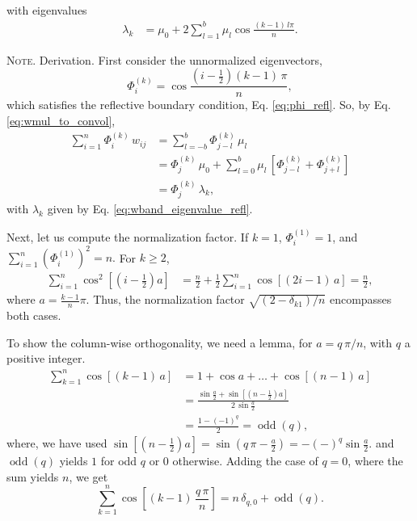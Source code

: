 \documentclass[preprint, floatfix]{revtex4-1}
\newcommand{\note}[1]{{\color{DarkGreen}\footnotesize \textsc{Note.} #1}}
\begin{document}
%
with eigenvalues
%
\begin{align}
  \lambda_k
  &=
  \mu_0
  +
  2
  \sum_{l = 1}^b
    \mu_l
    \cos \frac{(k - 1)  \, l \pi}{n}
  .
\label{eq:wband_eigenvalue_refl}
\end{align}
%
\note{Derivation.
  First consider the unnormalized eigenvectors,
  $$
  \Phi^{(k)}_i
  =
  \cos \frac{ \left( i - \frac 1 2 \right) (k - 1) \, \pi}{n},
  $$
  which satisfies the reflective boundary condition,
  Eq. \eqref{eq:phi_refl}.
  So, by Eq. \eqref{eq:wmul_to_convol},
  $$
  \begin{aligned}
  \sum_{i = 1}^n
    \Phi^{(k)}_i \, w_{ij}
  &=
  \sum_{l = -b}^b
    \Phi^{(k)}_{j - l} \, \mu_l
  \\
  &=
    \Phi^{(k)}_j \, \mu_0
  + \sum_{l=0}^{b}
    \mu_l \,
    \left[
      \Phi^{(k)}_{j-l}
      +
      \Phi^{(k)}_{j+l}
    \right]
  \\
  &= \Phi^{(k)}_j \, \lambda_k,
  \end{aligned}
  $$
  with $\lambda_k$ given by Eq. \eqref{eq:wband_eigenvalue_refl}.

  \hrulefill

  Next, let us compute the normalization factor.
  If $k = 1$, $\Phi^{(1)}_i = 1$, and
  $
  \sum_{i = 1}^n \left( \Phi^{(1)}_i \right)^2 = n.
  $
  For $k \ge 2$,
  $$
  \begin{aligned}
    \sum_{i = 1}^n \cos^2 \left[\left(i - \frac1 2 \right) a\right]
    &=
    \frac n 2
    +
    \frac 1 2
    \sum_{i = 1}^n \cos\left[(2 i - 1)\, a \right]
    =
    \frac n 2,
  \end{aligned}
  $$
  where $a = \frac{k-1}{n} \pi$.
  Thus, the normalization factor $\sqrt{(2 - \delta_{k1})/n}$
  encompasses both cases.

  \hrulefill

  To show the column-wise orthogonality,
  we need a lemma, for $a = q \, \pi/n$,
  with $q$ a positive integer.
  $$
  \begin{aligned}
  \sum_{k = 1}^n \cos[(k - 1) \, a]
  &=
  1 + \cos a + \dots + \cos[(n - 1) \, a]
  \\
  &=
  \frac{
        \sin\frac a 2
      + \sin \left[ \left( n - \frac 1 2 \right) a \right]
      }
      {
        2 \, \sin \frac a 2
      }
  \\
  &=
  \frac{ 1 - (-1)^q } { 2 }
  = \operatorname{odd}(q),
  \end{aligned}
  $$
  where, we have used
  $\sin \left[ \left( n - \frac 1 2 \right) a \right]
  = \sin \left( q \, \pi - \frac a 2 \right)
  = -(-)^q\sin\frac a 2.$
  and $\operatorname{odd}(q)$
  yields $1$ for odd $q$ or $0$ otherwise.
  Adding the case of $q = 0$, where the sum yields $n$,
  we get
  $$
  \sum_{k = 1}^n
    \cos\left[(k - 1) \, \frac { q \, \pi } { n }  \right]
  = n \, \delta_{q, 0}
  + \operatorname{odd}(q).
  $$

}
\end{document}
